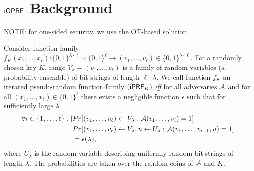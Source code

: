 \section{$\mathsf{i}\mathsf{OPRF}$ Background}
NOTE: for one-sided security, we use the OT-based solution.


\begin{definition}[$\iprf$]
  Consider function family
  $f_K(x_1,\ldots,x_\ell):\{0,1\}^{\lambda\cdot\ell}\times\{0,1\}^{\ell}\rightarrow{}(v_1,\ldots,v_\ell)\in\{0,1\}^{\lambda\cdot\ell}$. For
  a randomly chosen key $K$, range $V_\lambda=(v_1,\ldots,v_\ell)$ is
  a family of random variables (a probability ensemble) of bit strings
  of length $\ell\cdot\lambda$. We call function $f_K$ an iterated
  pseudo-random function family $(\mathsf{i}\mathsf{PRF}_K)$ \emph{iff} for all
  adversaries ${\mathcal{A}}$ and for all $(x_1,\ldots,x_\ell)\in\{0,1\}^\ell$
  there exists a negligible function $\epsilon$ such that for
  sufficiently large $\lambda$
\begin{align*}\forall{}i\in\{1,\ldots,\ell\}:|&Pr[(v_1,\ldots,v_\ell)\leftarrow{}V_\lambda:{\mathcal{A}}(v_1,\ldots,v_i)=1]-\\&Pr[(v_1,\ldots,v_\ell)\leftarrow{}V_\lambda,u\leftarrow{}U_\lambda:{\mathcal{A}}(v_1,\ldots,v_{i-1},u)=1]|\\&=\epsilon(\lambda),
  \end{align*}
  where $U_\lambda$ is the random variable describing uniformly random
  bit strings of length $\lambda$. The probabilities are taken over
  the random coins of ${\mathcal{A}}$ and $K$.

\end{definition}

